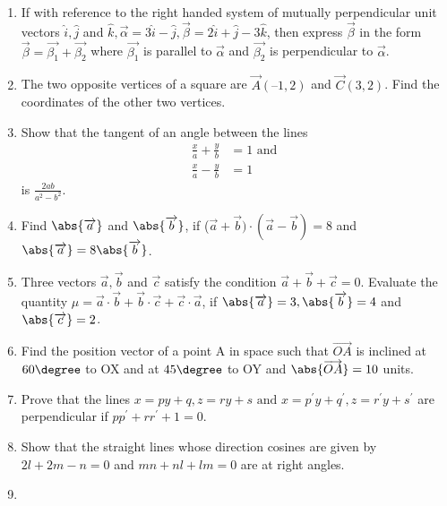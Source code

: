 \begin{enumerate}[label=\thesubsection.\arabic*,ref=\thesubsection.\theenumi]
\item If with reference to the right handed system of mutually perpendicular unit vectors $\hat{i},\hat{j}$ and $\hat{k}, \overrightarrow{\alpha} = 3\hat{i} -\hat{j}, \overrightarrow{\beta}= 2\hat{i} +\hat{j} -3\hat{k}$, then express $\overrightarrow{\beta}$ in the form $\overrightarrow{\beta} = \overrightarrow{\beta_1} +\overrightarrow{\beta_2}$ where $\overrightarrow{\beta_1}$ is parallel to $\overrightarrow{\alpha}$ and $\overrightarrow{\beta_2}$ is perpendicular to $\overrightarrow{\alpha}$.
\item The two opposite vertices of a square are $\vec{A}(–1, 2)$  and $ \vec{C}(3, 2)$. Find the coordinates of the other two vertices.
\\
\solution
	
\item Show that the tangent of an angle between the lines 
\begin{align}
	\frac{x}{a}+\frac{y}{b}&=1 \text{ and }
	\\
	\frac{x}{a}-\frac{y}{b}&=1 
\end{align}
is $\frac{2ab}{a^2-b^2}$.
\item Find $\abs{\overrightarrow {a}}$ and $\abs{\overrightarrow {b}}$, if ($\overrightarrow {a}+\overrightarrow {b})\cdot (\overrightarrow {a}-\overrightarrow {b})=8$ and $\abs{\overrightarrow {a}}=8\abs{\overrightarrow {b}}$.
	\\
	\solution
		
\item Three vectors $\overrightarrow{a}, \overrightarrow{b}$ and $\overrightarrow{c}$ satisfy the condition $\overrightarrow{a} +\overrightarrow{b} +\overrightarrow{c} =0$. Evaluate the quantity $\mu = \overrightarrow{a}\cdot \overrightarrow{b} +\overrightarrow{b} \cdot \overrightarrow{c} +\overrightarrow{c} \cdot \overrightarrow{a}$, if $\abs{\overrightarrow{a}}=3, \abs{\overrightarrow{b}}=4$ and $\abs{\overrightarrow{c}}=2$. 
\item  Find the position vector of a point A in space such that $\overrightarrow{OA}$ is inclined at $60 \degree$ to OX and at $45 \degree$ to OY and $\abs{\overrightarrow{OA}} =10$ units.
\item Prove that the lines $x=py+q , z=ry+s \text{ and } x=p^{\prime}y+q^{\prime}, z=r^{\prime}y+s^{\prime} $ are perpendicular if $pp^{\prime}+rr^{\prime}+1=0$.
\item Show that the straight lines whose direction cosines are given by $2l+2m-n=0$ and $mn+nl+lm=0$ are at right angles.
\item 

\end{enumerate}
